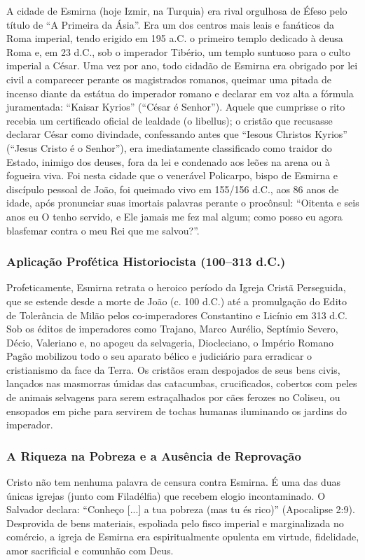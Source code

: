 \documentclass[11pt,a4paper,openany]{book}
\begin{document}
A cidade de Esmirna (hoje Izmir, na Turquia) era rival orgulhosa de Éfeso pelo título de ``A Primeira da Ásia''. Era um dos centros mais leais e fanáticos da Roma imperial, tendo erigido em 195 a.C. o primeiro templo dedicado à deusa Roma e, em 23 d.C., sob o imperador Tibério, um templo suntuoso para o culto imperial a César. Uma vez por ano, todo cidadão de Esmirna era obrigado por lei civil a comparecer perante os magistrados romanos, queimar uma pitada de incenso diante da estátua do imperador romano e declarar em voz alta a fórmula juramentada: ``Kaisar Kyrios'' (``César é Senhor''). Aquele que cumprisse o rito recebia um certificado oficial de lealdade (o libellus); o cristão que recusasse declarar César como divindade, confessando antes que ``Iesous Christos Kyrios'' (``Jesus Cristo é o Senhor''), era imediatamente classificado como traidor do Estado, inimigo dos deuses, fora da lei e condenado aos leões na arena ou à fogueira viva. Foi nesta cidade que o venerável Policarpo, bispo de Esmirna e discípulo pessoal de João, foi queimado vivo em 155/156 d.C., aos 86 anos de idade, após pronunciar suas imortais palavras perante o procônsul: ``Oitenta e seis anos eu O tenho servido, e Ele jamais me fez mal algum; como posso eu agora blasfemar contra o meu Rei que me salvou?''.


\subsubsection*{Aplicação Profética Historiocista (100–313 d.C.)}
Profeticamente, Esmirna retrata o heroico período da Igreja Cristã Perseguida, que se estende desde a morte de João (c. 100 d.C.) até a promulgação do Edito de Tolerância de Milão pelos co-imperadores Constantino e Licínio em 313 d.C. Sob os éditos de imperadores como Trajano, Marco Aurélio, Septímio Severo, Décio, Valeriano e, no apogeu da selvageria, Diocleciano, o Império Romano Pagão mobilizou todo o seu aparato bélico e judiciário para erradicar o cristianismo da face da Terra. Os cristãos eram despojados de seus bens civis, lançados nas masmorras úmidas das catacumbas, crucificados, cobertos com peles de animais selvagens para serem estraçalhados por cães ferozes no Coliseu, ou ensopados em piche para servirem de tochas humanas iluminando os jardins do imperador.


\subsubsection*{A Riqueza na Pobreza e a Ausência de Reprovação}
Cristo não tem nenhuma palavra de censura contra Esmirna. É uma das duas únicas igrejas (junto com Filadélfia) que recebem elogio incontaminado. O Salvador declara: ``Conheço [...] a tua pobreza (mas tu és rico)'' (Apocalipse 2:9). Desprovida de bens materiais, espoliada pelo fisco imperial e marginalizada no comércio, a igreja de Esmirna era espiritualmente opulenta em virtude, fidelidade, amor sacrificial e comunhão com Deus.
\end{document}

